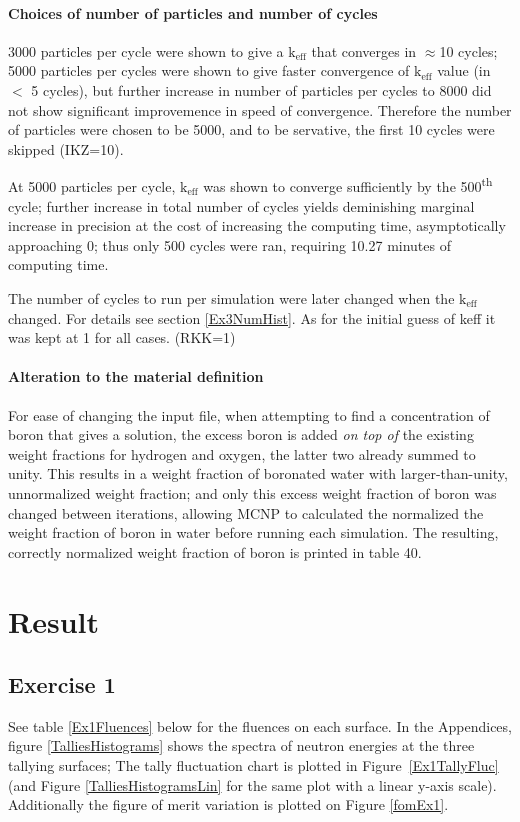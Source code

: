 \documentclass[a4paper, 11pt]{article}
\begin{document}
\paragraph{Choices of number of particles and number of cycles\indent}
3000 particles per cycle were shown to give a $\text{k}_{\text{eff}}$ that converges in $\approx$10 cycles; 5000 particles per cycles were shown to give faster convergence of $\text{k}_{\text{eff}}$ value (in $<$ 5 cycles), but further increase in number of particles per cycles to 8000 did not show significant improvemence in speed of convergence. Therefore the number of particles were chosen to be 5000, and to be servative, the first 10 cycles were skipped (IKZ=10).

At 5000 particles per cycle, $\text{k}_{\text{eff}}$ was shown to converge sufficiently by the 500\textsuperscript{th} cycle; further increase in total number of cycles yields deminishing marginal increase in precision at the cost of increasing the computing time, asymptotically approaching 0; thus only 500 cycles were ran, requiring 10.27 minutes of computing time.

The number of cycles to run per simulation were later changed when the $\text{k}_{\text{eff}}$ changed. For details see section \ref{Ex3NumHist}. As for the initial guess of keff it was kept at 1 for all cases. (RKK=1)

\paragraph{Alteration to the material definition\indent} For ease of changing the input file, when attempting to find a concentration of boron that gives a solution, the excess boron is added \emph{on top of} the existing weight fractions for hydrogen and oxygen, the latter two already summed to unity. This results in a weight fraction of boronated water with larger-than-unity, unnormalized weight fraction; and only this excess weight fraction of boron was changed between iterations, allowing MCNP to calculated the normalized the weight fraction of boron in water before running each simulation. The resulting, correctly normalized weight fraction of boron is printed in table 40.

\section{Result}
\subsection{Exercise 1}
See table \ref{Ex1Fluences} below for the fluences on each surface. In the Appendices, figure \ref{TalliesHistograms} shows the spectra of neutron energies at the three tallying surfaces; The tally fluctuation chart is plotted in Figure~\ref{Ex1TallyFluc} (and Figure \ref{TalliesHistogramsLin} for the same plot with a linear y-axis scale). Additionally the figure of merit variation is plotted on Figure \ref{fomEx1}.
\end{document}
